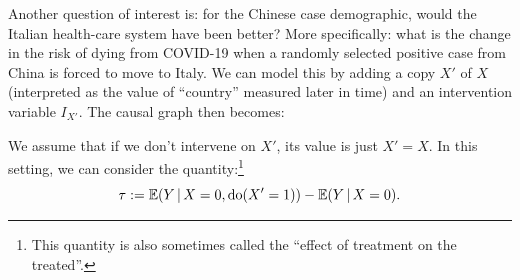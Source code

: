 Another question of interest is: for the Chinese case demographic, would the Italian health-care system have been better?
More specifically: what is the change in the risk of dying from COVID-19 when a randomly selected positive case from
China is forced to move to Italy.
We can model this by adding a copy $X'$ of $X$ (interpreted as the value of ``country'' measured later in time) and an intervention variable $I_{X'}$.
The causal graph then becomes:
\begin{center}\end{center}
We assume that if we don't intervene on $X'$, its value is just $X' = X$.
In this setting, we can consider the quantity:\footnote{This quantity is also sometimes called the ``effect of treatment on the treated''.}
\begin{equation*}
  \tau := \mathbb{E}(Y \operatorname*{|} X=0, \operatorname{do}(X'=1)) - \mathbb{E}(Y \operatorname*{|} X=0).
\end{equation*}
